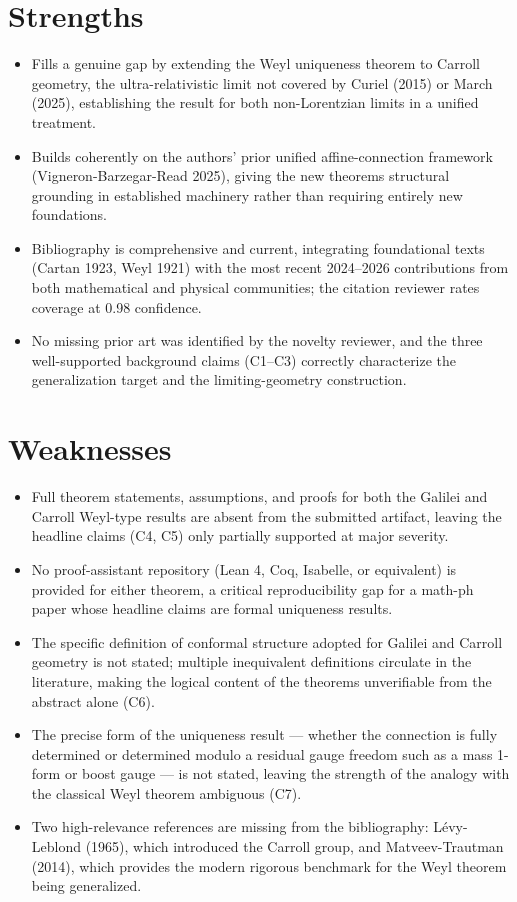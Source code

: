 \documentclass[11pt]{article}
\begin{document}
\section*{Strengths}
\begin{itemize}[leftmargin=*]
  \item Fills a genuine gap by extending the Weyl uniqueness theorem to Carroll geometry, the ultra-relativistic limit not covered by Curiel (2015) or March (2025), establishing the result for both non-Lorentzian limits in a unified treatment.
  \item Builds coherently on the authors' prior unified affine-connection framework (Vigneron-Barzegar-Read 2025), giving the new theorems structural grounding in established machinery rather than requiring entirely new foundations.
  \item Bibliography is comprehensive and current, integrating foundational texts (Cartan 1923, Weyl 1921) with the most recent 2024–2026 contributions from both mathematical and physical communities; the citation reviewer rates coverage at 0.98 confidence.
  \item No missing prior art was identified by the novelty reviewer, and the three well-supported background claims (C1–C3) correctly characterize the generalization target and the limiting-geometry construction.
\end{itemize}

\section*{Weaknesses}
\begin{itemize}[leftmargin=*]
  \item Full theorem statements, assumptions, and proofs for both the Galilei and Carroll Weyl-type results are absent from the submitted artifact, leaving the headline claims (C4, C5) only partially supported at major severity.
  \item No proof-assistant repository (Lean 4, Coq, Isabelle, or equivalent) is provided for either theorem, a critical reproducibility gap for a math-ph paper whose headline claims are formal uniqueness results.
  \item The specific definition of conformal structure adopted for Galilei and Carroll geometry is not stated; multiple inequivalent definitions circulate in the literature, making the logical content of the theorems unverifiable from the abstract alone (C6).
  \item The precise form of the uniqueness result — whether the connection is fully determined or determined modulo a residual gauge freedom such as a mass 1-form or boost gauge — is not stated, leaving the strength of the analogy with the classical Weyl theorem ambiguous (C7).
  \item Two high-relevance references are missing from the bibliography: Lévy-Leblond (1965), which introduced the Carroll group, and Matveev-Trautman (2014), which provides the modern rigorous benchmark for the Weyl theorem being generalized.
\end{itemize}
\end{document}
